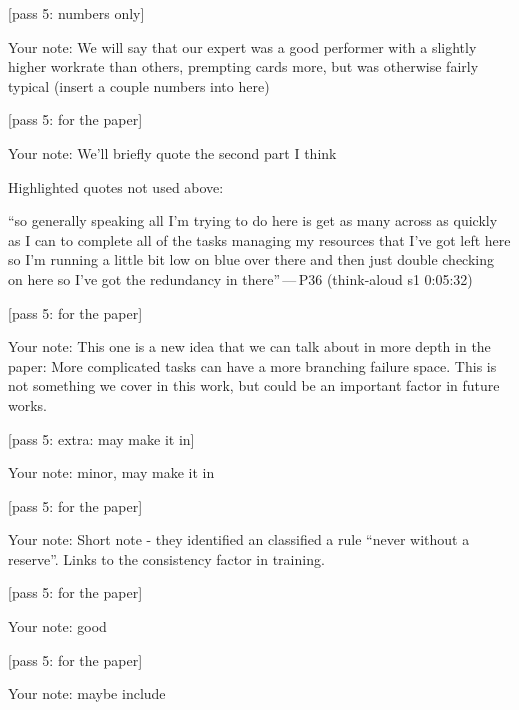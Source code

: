\begin{options}

 {\footnotesize [pass 5: numbers only]}

\noindent Your note: We will say that our expert was a good performer with a slightly higher workrate than others, prempting cards more, but was otherwise fairly typical (insert a couple numbers into here)

 {\footnotesize [pass 5: for the paper]}

\noindent Your note: We'll briefly quote the second part I think

\noindent Highlighted quotes not used above:\begin{quotelist}
\item ``so generally speaking all I'm trying to do here is get as many across as quickly as I can to complete all of the tasks managing my resources that I've got left here so I'm running a little bit low on blue over there and then just double checking on here so I've got the redundancy in there''\,---\,P36 (think-aloud s1 0:05:32)\par{}
\end{quotelist}

 {\footnotesize [pass 5: for the paper]}

\noindent Your note: This one is a new idea that we can talk about in more depth in the paper: More complicated tasks can have a more branching failure space. This is not something we cover in this work, but could be an important factor in future works.

 {\footnotesize [pass 5: extra: may make it in]}

\noindent Your note: minor, may make it in

 {\footnotesize [pass 5: for the paper]}

\noindent Your note: Short note - they identified an classified a rule ``never without a reserve''. Links to the consistency factor in training.

 {\footnotesize [pass 5: for the paper]}

\noindent Your note: good

 {\footnotesize [pass 5: for the paper]}

\noindent Your note: maybe include
\end{options}

\clearpage

